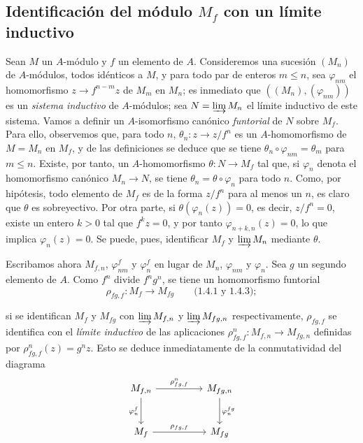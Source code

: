 \subsection{Identificación del módulo $M_f$ con un límite inductivo}
\label{subsection:0.1.6-fr}

\begin{env}[1.6.1]
\label{0.1.6.1-fr}
Sean $M$ un $A$-módulo y $f$ un elemento de $A$. Consideremos una sucesión
$(M_n)$ de $A$-módulos, todos idénticos a $M$, y para todo par de enteros
$m\leq n$, sea $\varphi_{nm}$ el homomorfismo $z\to f^{n-m}z$ de $M_m$
en $M_n$; es inmediato que $((M_n),(\varphi_{nm}))$ es un \emph{sistema
inductivo} de $A$-módulos; sea $N=\varinjlim M_n$ el límite inductivo de este
sistema. Vamos a definir un $A$-isomorfismo canónico \emph{funtorial} de
$N$ sobre $M_f$. Para ello, observemos que, para todo $n$,
$\theta_n:z\to z/f^n$ es un $A$-homomorfismo de $M=M_n$ en $M_f$, y
de las definiciones se deduce que se tiene $\theta_n\circ\varphi_{nm}=\theta_m$ para
$m\leq n$. Existe, por tanto, un $A$-homomorfismo $\theta:N\to M_f$ tal que, si
$\varphi_n$ denota el homomorfismo canónico $M_n\to N$, se tiene
$\theta_n=\theta\circ\varphi_n$ para todo $n$. Como, por hipótesis, todo elemento
de $M_f$ es de la forma $z/f^n$ para al menos un $n$, es claro que
$\theta$ es sobreyectivo. Por otra parte, si $\theta(\varphi_n(z))=0$, es decir,
$z/f^n=0$, existe un entero $k>0$ tal que $f^kz=0$, y por tanto
$\varphi_{n+k,n}(z)=0$, lo que implica $\varphi_n(z)=0$. Se puede, pues,
identificar $M_f$ y $\varinjlim M_n$ mediante $\theta$.
\end{env}

\begin{env}[1.6.2]
\label{0.1.6.2-fr}
Escribamos ahora $M_{f,n}$, $\varphi_{nm}^f$ y $\varphi_n^f$ en lugar de
$M_n$, $\varphi_{nm}$ y $\varphi_n$. Sea $g$ un segundo elemento de $A$. Como
$f^n$ divide $f^ng^n$, se tiene un homomorfismo funtorial
\[
  \rho_{fg,f}:M_f\longrightarrow M_{fg}\qquad\text{(1.4.1 y 1.4.3)};
\]


si se identifican $M_f$ y $M_{fg}$ con $\varinjlim M_{f,n}$ y
$\varinjlim M_{fg,n}$ respectivamente, $\rho_{fg,f}$ se identifica con el
\emph{límite inductivo} de las aplicaciones
$\rho_{fg,f}^n:M_{f,n}\to M_{fg,n}$ definidas por
$\rho_{fg,f}^n(z)=g^nz$. Esto se deduce inmediatamente de la
conmutatividad del diagrama
\[
\begin{tikzcd}[column sep=huge,row sep=large]
M_{f,n} \arrow[r,"\rho_{fg,f}^n"] \arrow[d,"\varphi_n^f"']
  & M_{fg,n} \arrow[d,"\varphi_n^{fg}"] \\
M_f \arrow[r,"\rho_{fg,f}"]
  & M_{fg}
\end{tikzcd}
\]
\end{env}

